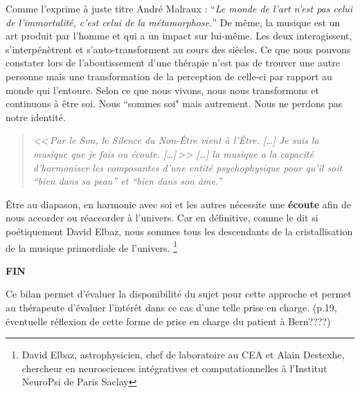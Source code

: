  



Comme l'exprime à juste titre André Malraux : \enquote{\emph{Le monde de
	l'art n'est pas celui de l'immortalité, c'est celui de la métamorphose.}}
De même, la musique est un art produit par l'homme et qui a un impact
sur lui-même. Les deux interagissent, s'interpénètrent et s'auto-transforment
au cours des siècles.
 Ce que nous pouvons constater lors de l'aboutissement
d'une thérapie n'est pas de trouver une autre personne mais une transformation
de la perception de celle-ci par rapport au monde qui l'entoure. 
Selon
ce que nous vivons, nous nous transformons et continuons à être
soi. Nous ``sommes soi" mais autrement. Nous ne perdons
pas notre identité.


\label{jeSuisLaMusique:viret}
\begin{quotation}
\emph{<<\,\emph{Par le Son, le Silence du Non-Être vient à l'Être}. [\dots] 
\textsl{Je suis}
	\emph{la musique que je fais ou écoute}. [\dots]\,>>
[\ldots] \emph{la musique a la capacité d'harmoniser
les composantes d'une entité psychophysique pour qu'il soit ``bien
dans sa peau'' et ``bien dans son âme.}''}\, \autocite[ch. 1, p.8]{viret:b}
\end{quotation}

Être au diapason, en harmonie avec soi et les autres
nécessite une\textbf{ écoute }afin de nous accorder ou réaccorder à l'univers.
Car en définitive, comme le dit si poétiquement David Elbaz, nous sommes tous les
descendants de la cristallisation de la musique primordiale de
l'univers. \autocite{delbaz_recherche_2016} \footnote{David Elbaz, astrophysicien, chef de laboratoire au CEA et Alain
Destexhe, chercheur en neurosciences intégratives et computationnelles
à l'Institut  NeuroPsi de Paris Saclay} 






                                                                                    \textbf{FIN}





Ce bilan permet d'évaluer la disponibilité du sujet pour cette
approche et permet au thérapeute d'évaluer l'intérêt dans ce cas
d'une telle prise en charge. (p.19, éventuelle réflexion de cette
forme de prise en charge du patient à Bern????)


